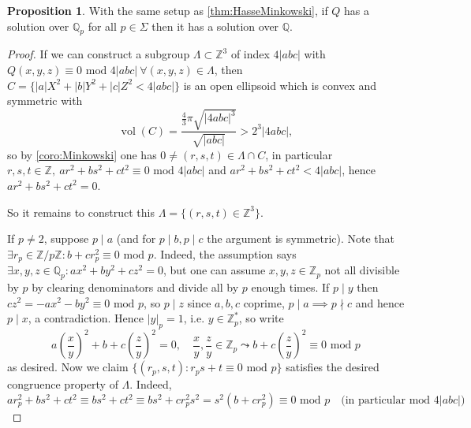 \documentclass{article}
\newcommand{\Z}{\mathbb{Z}}
\newcommand{\Q}{\mathbb{Q}}
\newcommand{\Mod}{\text{ mod }}
\newcommand{\vol}{\operatorname{vol}}
\theoremstyle{definition}
\newtheorem{prop}[defn]{Proposition}
\begin{document}
\begin{prop}
With the same setup as \ref{thm:HasseMinkowski}, if $Q$ has a solution over $\Q_p$ for all $p\in\Sigma$ then it has a solution over $\Q$.
\end{prop}
\begin{proof}
If we can construct a subgroup $\Lambda\subset\Z^3$ of index $4|abc|$ with $Q(x,y,z)\equiv 0\Mod 4|abc| \ \forall (x,y,z)\in\Lambda$, then $C=\{|a|X^2+|b|Y^2+|c|Z^2<4|abc|\}$ is an open ellipsoid which is convex and symmetric with
\[
\vol(C)=\frac{\frac43\pi\sqrt{|4abc|^3}}{\sqrt{|abc|}}>2^3|4abc|,
\]
so by \ref{coro:Minkowski} one has $0\neq (r,s,t)\in\Lambda\cap C$, in particular $r,s,t\in\Z,\ ar^2+bs^2+ct^2\equiv 0\Mod 4|abc|$ and $ar^2+bs^2+ct^2<4|abc|$, hence $ar^2+bs^2+ct^2=0$.

So it remains to construct this $\Lambda=\{(r,s,t)\in\Z^3\}$.

If $p\neq 2$, suppose $p\mid a$ (and for $p\mid b,p\mid c$ the argument is symmetric). Note that $\exists r_p\in\Z/p\Z:b+cr_p^2\equiv 0\Mod p$. Indeed, the assumption says $\exists x,y,z\in\Q_p:ax^2+by^2+cz^2=0$, but one can assume $x,y,z\in\Z_p$ not all divisible by $p$ by clearing denominators and divide all by $p$ enough times. If $p\mid y$ then $cz^2=-ax^2-by^2\equiv 0\Mod p$, so $p\mid z$ since $a,b,c$ coprime, $p\mid a \implies p\nmid c$ and hence $p\mid x$, a contradiction. Hence $|y|_p=1$, i.e. $y\in\Z_p^\ast$, so write
\[
a\left(\frac{x}{y}\right)^2+b+c\left(\frac{z}{y}\right)^2=0,\quad \frac{x}{y},\frac{z}{y}\in\Z_p \leadsto b+c\left(\frac{z}{y}\right)^2\equiv 0\Mod p
\]
as desired. Now we claim $\{(r_p,s,t):r_ps+t\equiv 0\Mod p\}$ satisfies the desired congruence property of $\Lambda$. Indeed,
\[
ar_p^2+bs^2+ct^2\equiv bs^2+ct^2\equiv bs^2+cr_p^2s^2=s^2(b+cr_p^2)\equiv 0\Mod p \quad \text{(in particular mod }4|abc|\text{)}
\]


\end{proof}
\end{document}
